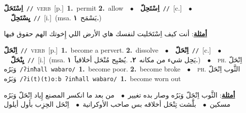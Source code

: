 \documentclass[10pt,a4paper,twoside]{article} %
\begin{document}
\begin{multicols}{2}
{\setlength\topsep{0pt}\textbf{\foreignlanguage{arabic}{اِسْتَحَلّ}}\ {\color{gray}\texttt{//}\color{black}}\ \textsc{verb}\ [p.]\ \textbf{1.}~permit  \textbf{2.}~allow\ \ $\bullet$\ \ \setlength\topsep{0pt}\textbf{\foreignlanguage{arabic}{اِسْتَحِلّ}}\ {\color{gray}\texttt{//}\color{black}}\ [c.]\ \ $\bullet$\ \ \setlength\topsep{0pt}\textbf{\foreignlanguage{arabic}{يِسْتَحِلّ}}\ {\color{gray}\texttt{//}\color{black}}\ [i.]\ \color{gray}(msa. \foreignlanguage{arabic}{يَسْمَح}~\foreignlanguage{arabic}{\textbf{١.}})\color{black}\  \begin{flushright}\color{gray}\foreignlanguage{arabic}{\textbf{\underline{\foreignlanguage{arabic}{أمثلة}}}: أنت كيف اِسْتَحَليت لنفسك هاي الأرض اللي إِخوتك الهم حقوق فيها}\end{flushright}\color{black}} \vspace{2mm}

{\setlength\topsep{0pt}\textbf{\foreignlanguage{arabic}{اِنْحَلّ}}\ {\color{gray}\texttt{//}\color{black}}\ \textsc{verb}\ [p.]\ \textbf{1.}~become a pervert.  \textbf{2.}~dissolve\ \ $\bullet$\ \ \setlength\topsep{0pt}\textbf{\foreignlanguage{arabic}{اِنْحَلّ}}\ {\color{gray}\texttt{//}\color{black}}\ [c.]\ \ $\bullet$\ \ \setlength\topsep{0pt}\textbf{\foreignlanguage{arabic}{يِنْحَلّ}}\ {\color{gray}\texttt{//}\color{black}}\ [i.]\ \color{gray}(msa. \foreignlanguage{arabic}{يَحِل شيء من مكانه}~\foreignlanguage{arabic}{\textbf{٢.}}  .\foreignlanguage{arabic}{يُصْبِح مُنْحَل أخلاقياََ}~\foreignlanguage{arabic}{\textbf{١.}})\color{black}\ \ $\bullet$\ \ \textsc{ph.} \color{gray} \foreignlanguage{arabic}{اِنْحَلّ وَبَرُه}\color{black}\ {\color{gray}\texttt{/{\sffamily ʔinħall wabaro}/}\color{black}}\ \textbf{1.}~become poor.  \textbf{2.}~become broke\ \ $\bullet$\ \ \textsc{ph.} \color{gray} \foreignlanguage{arabic}{الثَّوب اِنْحَلّ وَبَرُه}\color{black}\ {\color{gray}\texttt{/{\sffamily ʔi(t)(t)oːb ʔinħall wabaro}/}\color{black}}\ \textbf{1.}~become worn out\  \begin{flushright}\color{gray}\foreignlanguage{arabic}{\textbf{\underline{\foreignlanguage{arabic}{أمثلة}}}: الثَّوب اِنْحَلّ وَبَرُه وصار بده تغيير\ $\bullet$\ \  من بعد ما انكسر المصنع إِياد اِنْحَلّ وَبَرُه مسكين\ $\bullet$\ \  بلَّشت تِنْحَل أخلاقه بس صاحب الأوكرانية\ $\bullet$\ \  اِنْحَل الحِزِب بأول أيلول}\end{flushright}\color{black}} \vspace{2mm}


\end{multicols}
\end{document}
